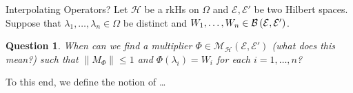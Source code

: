 \documentclass{beamer}
\newtheorem{question}[theorem]{Question}
\newcommand{\D}{\mathbb D}
\newcommand{\T}{\mathbb T}
\newcommand{\calE}{{\mathcal E}}
\newcommand{\calH}{{\mathcal H}}
\newcommand{\calM}{{\mathcal M}}
\newcommand{\norm}[1]{\left\lVert #1 \right\rVert}
\newcommand{\abs}[1]{\left\lvert #1 \right\rvert}
\begin{document}
\begin{frame}{Interpolating Operators?}
Let $\calH$ be a rkHs on $\Omega$ and $\calE , \calE'$ be two Hilbert spaces.
\pause
Suppose that $\lambda_{1}, \ldots, \lambda_{n} \in \Omega$ be distinct and $W_{1}, \ldots , W_{n} \in \cal{B} \left( \calE , \calE' \right)$. 
\pause
\begin{question}
When can we find a multiplier $\Phi \in \calM_{\calH} \left( \calE , \calE' \right)$ (\textit{what does this mean?}) such that $\norm{M_{\Phi}} \le 1$ and $\Phi \left( \lambda_{i} \right) = W_{i}$ for each $i=1, \ldots , n$?
\end{question}
\pause
To this end, we define the notion of \ldots

\end{frame}



\end{document}
